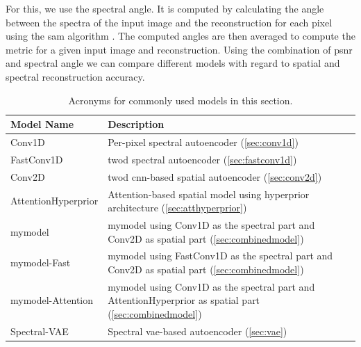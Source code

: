 For this, we use the spectral angle. It is computed by calculating the angle between the spectra of the input image and the reconstruction for each pixel using the \ac{sam} algorithm \citep{kruse_spectral_1993}. The computed angles are then averaged to compute the metric for a given input image and reconstruction. Using the combination of \ac{psnr} and spectral angle we can compare different models with regard to spatial and spectral reconstruction accuracy.
\begin{table}
\centering
\caption{Acronyms for commonly used models in this section.}
\begin{tabularx}{\textwidth}{|L|L|}
\hline
Model Name & Description \\
\hline\hline
Conv1D & Per-pixel spectral autoencoder (\autoref{sec:conv1d})\\
\hline
FastConv1D & \Ac{twod} spectral autoencoder (\autoref{sec:fastconv1d})\\
\hline
Conv2D & \Ac{twod} \ac{cnn}-based spatial autoencoder (\autoref{sec:conv2d})\\
\hline
AttentionHyperprior & Attention-based spatial model using hyperprior architecture (\autoref{sec:atthyperprior}) \\
\hline
\ac{mymodel} & \ac{mymodel} using Conv1D as the spectral part and Conv2D as spatial part (\autoref{sec:combinedmodel}) \\
\hline
\ac{mymodel}-Fast & \ac{mymodel} using FastConv1D as the spectral part and Conv2D as spatial part (\autoref{sec:combinedmodel}) \\
\hline
\ac{mymodel}-Attention & \ac{mymodel} using Conv1D as the spectral part and AttentionHyperprior as spatial part (\autoref{sec:combinedmodel}) \\
\hline
Spectral-VAE & Spectral \ac{vae}-based autoencoder (\autoref{sec:vae}) \\
\hline
\end{tabularx}
\label{fig:shortnames}
\end{table}

